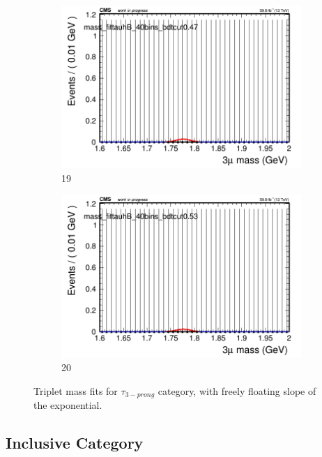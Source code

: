 \begin{figure}[h!]
\begin{subfigure}{0.2\textwidth}
        \includegraphics[width=\textwidth]{power_law/plots/tauhB/massfit_tauhB_40bins_bdtcut0.47.png}
        \caption{19}
    \end{subfigure}
    \begin{subfigure}{0.2\textwidth}
        \includegraphics[width=\textwidth]{power_law/plots/tauhB/massfit_tauhB_40bins_bdtcut0.53.png}
        \caption{20}
    \end{subfigure}
    \caption{Triplet mass fits for $\tau_{3-prong}$ category, with freely floating slope of the exponential.}
    \label{fig:unfixed_tauhb}
\end{figure}


\newpage

\subsection{Inclusive Category}
\label{sec:all_cat}

